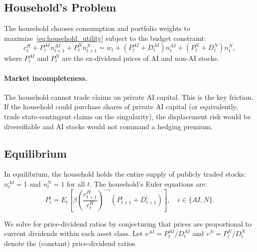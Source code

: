 \documentclass[12pt]{article}
\begin{document}
\subsection{Household's Problem}

The household chooses consumption and portfolio weights to maximize~\eqref{eq:household_utility} subject to the budget constraint:
\begin{equation}
    c_t^H + P_t^{AI} n_{t+1}^{AI} + P_t^{N} n_{t+1}^{N} = w_t + (P_t^{AI} + D_t^{AI}) n_t^{AI} + (P_t^{N} + D_t^{N}) n_t^{N}, \label{eq:budget}
\end{equation}
where $P_t^{AI}$ and $P_t^{N}$ are the ex-dividend prices of AI and non-AI stocks.

\paragraph{Market incompleteness.} The household cannot trade claims on private AI capital. This is the key friction. If the household could purchase shares of private AI capital (or equivalently, trade state-contingent claims on the singularity), the displacement risk would be diversifiable and AI stocks would not command a hedging premium.

\subsection{Equilibrium}

In equilibrium, the household holds the entire supply of publicly traded stocks: $n_t^{AI} = 1$ and $n_t^{N} = 1$ for all $t$. The household's Euler equations are:
\begin{equation}
    P_t^{i} = E_t \left[ \beta \left(\frac{c_{t+1}^H}{c_t^H}\right)^{-\gamma} (P_{t+1}^{i} + D_{t+1}^{i}) \right], \quad i \in \{AI, N\}. \label{eq:euler}
\end{equation}

We solve for price-dividend ratios by conjecturing that prices are proportional to current dividends within each asset class. Let $v^{AI} = P_t^{AI} / D_t^{AI}$ and $v^{N} = P_t^{N} / D_t^{N}$ denote the (constant) price-dividend ratios.
\end{document}
